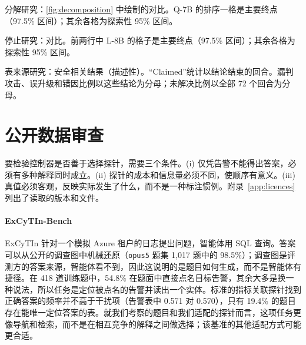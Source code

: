 \begin{table}[t]
  \centering\small
  \begin{adjustbox}{max width=\textwidth}\end{adjustbox}
  \caption{分解研究：\cref{fig:decomposition} 中绘制的对比。Q-7B 的排序一格是主要终点（97.5\% 区间）；其余各格为探索性 95\% 区间。}
  \label{tab:app-v08terms}
\end{table}

\begin{table}[t]
  \centering\small
  \begin{adjustbox}{max width=\textwidth}\end{adjustbox}
  \caption{停止研究：对比。前两行中 L-8B 的格子是主要终点（97.5\% 区间）；其余各格为探索性 95\% 区间。}
  \label{tab:app-v09terms}
\end{table}

\begin{table}[t]
  \caption{表来源研究：安全相关结果（描述性）。“Claimed”统计以结论结束的回合。漏判攻击、误升级和错因比例以这些结论为分母；未解决比例以全部 72 个回合为分母。}
  \label{tab:security}
  \centering\small
  \begin{adjustbox}{max width=\textwidth}\end{adjustbox}
\end{table}

\section{公开数据审查}
\label{app:public}

要检验控制器是否善于选择探针，需要三个条件。(i) 仅凭告警不能得出答案，必须有多种解释同时成立。(ii) 探针的成本和信息量必须不同，使顺序有意义。(iii) 真值必须客观，反映实际发生了什么，而不是一种标注惯例。附录~\ref{app:licences} 列出了读取的版本和文件。

\paragraph{ExCyTIn-Bench~\citep{excytin}} ExCyTIn 针对一个模拟 Azure 租户的日志提出问题，智能体用 SQL 查询。答案可以从公开的调查图中机械还原（\texttt{opus5} 题集 1{,}017 题中的 98.5\%）；调查图是评测方的答案来源，智能体看不到，因此这说明的是题目如何生成，而不是智能体有捷径。在 418 道训练题中，54.8\% 在题面中直接点名目标告警，其余大多是换一种说法，所以任务是定位被点名的告警并读出一个实体。标准的指标关联探针找到正确答案的频率并不高于干扰项（告警表中 0.571 对 0.570），只有 19.4\% 的题目存在能唯一定位答案的表。就我们考察的题目和我们适配的探针而言，这项任务更像导航和检索，而不是在相互竞争的解释之间做选择；该基准的其他适配方式可能更合适。


